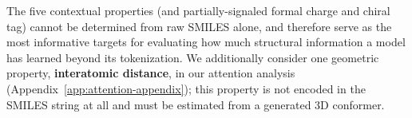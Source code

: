 The five contextual properties (and partially-signaled formal charge and chiral tag) cannot be determined from raw SMILES alone, and therefore serve as the most informative targets for evaluating how much structural information a model has learned beyond its tokenization. We additionally consider one geometric property, \textbf{interatomic distance}, in our attention analysis (Appendix~\ref{app:attention-appendix}); this property is not encoded in the SMILES string at all and must be estimated from a generated 3D conformer.
